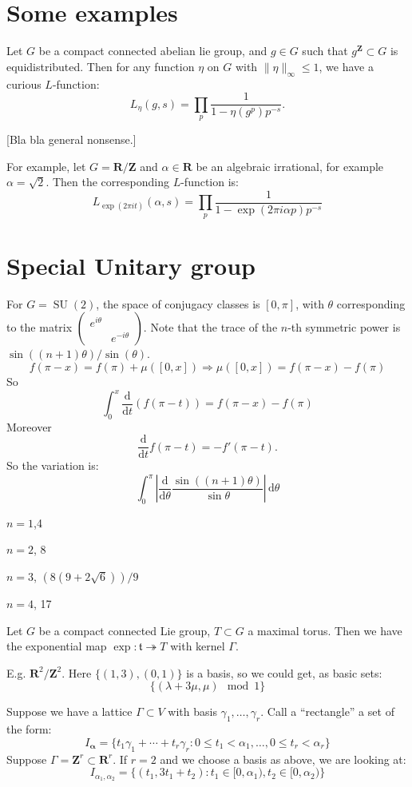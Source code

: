 \documentclass{article}
\DeclareMathOperator{\SU}{SU}
\newcommand{\bR}{\mathbf{R}}
\newcommand{\bZ}{\mathbf{Z}}
\newcommand{\dd}{\mathrm{d}}
\newcommand{\ft}{\mathfrak{t}}
\theoremstyle{definition}
\begin{document}
\section{Some examples}

Let $G$ be a compact connected abelian lie group, and $g\in G$ such that 
$g^\bZ\subset G$ is equidistributed. Then for any function $\eta$ on $G$ with 
$\|\eta\|_\infty\leqslant 1$, we have a curious $L$-function:
\[
	L_\eta(g,s) = \prod_p \frac{1}{1-\eta(g^p) p^{-s}} .
\]

[Bla bla general nonsense.]

For example, let $G=\bR/\bZ$ and $\alpha\in \bR$ be an algebraic irrational, 
for example $\alpha=\sqrt 2$. Then the corresponding $L$-function is:
\[
	L_{\exp(2\pi it)}(\alpha,s) = \prod_p \frac{1}{1-\exp(2\pi i \alpha p) p^{-s}}
\]





\section{Special Unitary group}

For $G=\SU(2)$, the space of conjugacy classes is $[0,\pi]$, with $\theta$ 
corresponding to the matrix $\begin{pmatrix} e^{i\theta} \\ & e^{-i\theta} \end{pmatrix}$. Note that the trace of the $n$-th symmetric power is 
$\sin((n+1)\theta)/\sin(\theta)$. 
\[
	f(\pi-x) = f(\pi) + \mu([0,x]) \Rightarrow \mu([0,x]) = f(\pi-x)-f(\pi)
\]
So
\[
	\int_0^x \frac{\dd}{\dd t}(f(\pi-t)) = f(\pi-x)-f(\pi)
\]
Moreover
\[
	\frac{\dd}{\dd t} f(\pi-t) = -f'(\pi-t) .
\]
So the variation is:
\[
	\int_0^\pi \left|\frac{\dd}{\dd \theta} \frac{\sin((n+1)\theta)}{\sin\theta}\right|\, \dd \theta 
\]

$n=1$,4

$n=2$, 8

$n=3$, $(8 (9 + 2 \sqrt 6))/9$

$n=4$, 17

Let $G$ be a compact connected Lie group, $T\subset G$ a maximal torus. Then 
we have the exponential map $\exp\colon \ft\twoheadrightarrow T$ with kernel 
$\Gamma$. 

E.g. $\bR^2/\bZ^2$. Here $\{(1,3),(0,1)\}$ is a basis, so we could get, as 
basic sets:
\[
	\{(\lambda+3\mu,\mu)\mod 1\}
\]

Suppose we have a lattice $\Gamma\subset V$ with basis 
$\gamma_1,\dots,\gamma_r$. Call a ``rectangle'' a set of the form:
\[
	I_{\boldsymbol\alpha} = \{t_1 \gamma_1 + \cdots + t_r \gamma_r : 0\leqslant t_1 < \alpha_1,\dots,0\leqslant t_r < \alpha_r\}
\]
Suppose $\Gamma=\bZ^r\subset \bR^r$. If $r=2$ and we choose a basis as above, 
we are looking at:
\[
	I_{\alpha_1,\alpha_2} = \{(t_1,3t_1+t_2) : t_1\in [0,\alpha_1),t_2\in [0,\alpha_2)\}
\]
\end{document}

